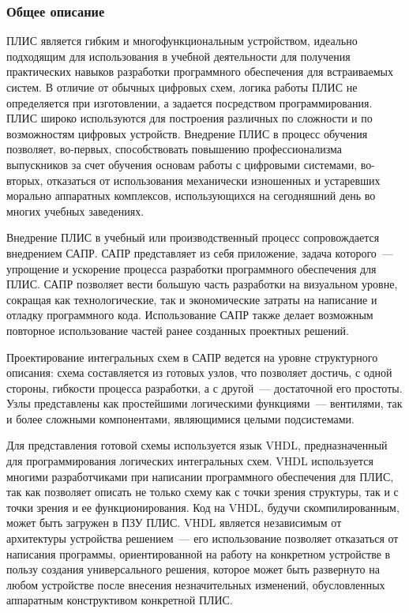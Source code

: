 \subsubsection{Общее описание} \label{sec:characteristics:summary}
ПЛИС является гибким и многофункциональным устройством, идеально подходящим для использования в учебной деятельности для получения практических навыков разработки программного обеспечения для встраиваемых систем.
В отличие от обычных цифровых схем, логика работы ПЛИС не определяется при изготовлении, а задается посредством программирования.
ПЛИС широко используются для построения различных по сложности и по возможностям цифровых устройств.
Внедрение ПЛИС в процесс обучения позволяет, во-первых, способствовать повышению профессионализма выпускников за счет обучения основам работы с цифровыми системами, во-вторых, отказаться от использования механически изношенных и устаревших морально аппаратных комплексов, использующихся на сегодняшний день во многих учебных заведениях.

Внедрение ПЛИС в учебный или производственный процесс сопровождается внедрением САПР.
САПР представляет из себя приложение, задача которого~--- упрощение и ускорение процесса разработки программного обеспечения для ПЛИС.
САПР позволяет вести большую часть разработки на визуальном уровне, сокращая как технологические, так и экономические затраты на написание и отладку программного кода.
Использование САПР также делает возможным повторное использование частей ранее созданных проектных решений.

Проектирование интегральных схем в САПР ведется на уровне структурного описания: схема составляется из готовых узлов, что позволяет достичь, с одной стороны, гибкости процесса разработки, а с другой~--- достаточной его простоты.
Узлы представлены как простейшими логическими функциями~--- вентилями, так и более сложными компонентами, являющимися целыми подсистемами.

Для представления готовой схемы используется язык VHDL, предназначенный для программирования логических интегральных схем.
VHDL используется многими разработчиками при написании программного обеспечения для ПЛИС, так как позволяет описать не только схему как с точки зрения структуры, так и с точки зрения и ее функционирования.
Код на VHDL, будучи скомпилированным, может быть загружен в ПЗУ ПЛИС.
VHDL является независимым от архитектуры устройства решением~--- его использование позволяет отказаться от написания программы, ориентированной на работу на конкретном устройстве в пользу создания универсального решения, которое может быть развернуто на любом устройстве после внесения незначительных изменений, обусловленных аппаратным конструктивом конкретной ПЛИС.
%
%
